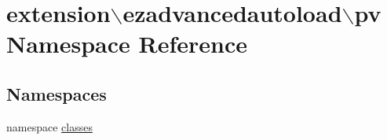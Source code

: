 \hypertarget{namespaceextension_1_1ezadvancedautoload_1_1pv}{\section{extension$\backslash$ezadvancedautoload$\backslash$pv Namespace Reference}
\label{namespaceextension_1_1ezadvancedautoload_1_1pv}
}
\subsection*{Namespaces}
\begin{DoxyCompactItemize}
\item 
namespace \hyperlink{namespaceextension_1_1ezadvancedautoload_1_1pv_1_1classes}{classes}
\end{DoxyCompactItemize}
